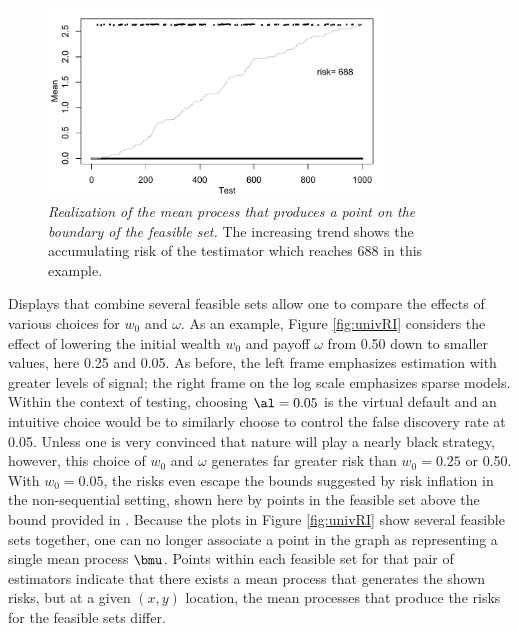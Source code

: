 \documentclass[12pt]{article}
\begin{document}
\begin{figure}
 \caption{ \label{fig:simRisk} {\sl Realization of the mean process that
 produces a point on the boundary of the feasible set.} The increasing trend
 shows the accumulating risk of the testimator which reaches 688 in this
 example.  }

 \vspace{0.1in}
 \centerline{
 \includegraphics[width=3.5in]{figures/simRisk}    }
 \vspace{0.2in}
\end{figure}


 Displays that combine several feasible sets allow one to compare the effects of
 various choices for $w_0$ and $\omega$.  As an example, Figure \ref{fig:univRI}
 considers the effect of lowering the initial wealth $w_0$ and payoff $\omega$
 from 0.50 down to smaller values, here 0.25 and 0.05.  As before, the left
 frame emphasizes estimation with greater levels of signal; the right frame on
 the log scale emphasizes sparse models.  Within the context of testing,
 choosing $\al=0.05$ is the virtual default and an intuitive choice would be to
 similarly choose to control the false discovery rate at 0.05.  Unless one is
 very convinced that nature will play a nearly black strategy, however, this
 choice of $w_0$ and $\omega$ generates far greater risk than $w_0=0.25$ or
 0.50.  With $w_0=0.05$, the risks even escape the bounds suggested by risk
 inflation in the non-sequential setting, shown here by points in the feasible
 set above the bound provided in .  Because the plots in Figure
 \ref{fig:univRI} show several feasible sets together, one can no longer
 associate a point in the graph as representing a single mean process $\bmu$.
  Points within each feasible set for that pair of estimators indicate that
 there exists a mean process that generates the shown risks, but at a given
 $(x,y)$ location, the mean processes that produce the risks for the feasible sets
 differ.
\end{document}

